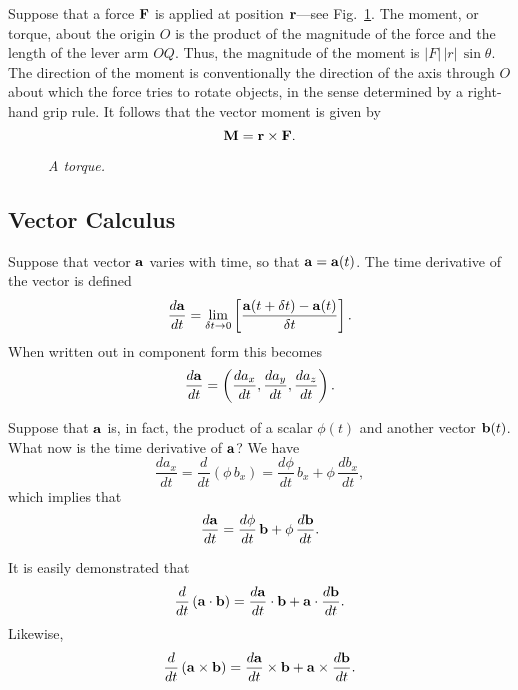 Suppose that a force ${\bf F}$ is applied at position ${\bf r}$---see Fig.~\ref{f8}.
The moment, or torque, about the origin $O$ is the product of the magnitude of the force and
the length of the lever arm $OQ$. Thus, the magnitude of the moment is
$|F|\,|r|\,\sin\theta$. The direction of the moment is conventionally the direction of
the axis through $O$ about which the force tries to rotate objects, in the sense
determined by a right-hand grip rule. It follows that the vector moment is
given by
\begin{equation}
{\bf M} = {\bf r}\times{\bf F}.
\end{equation}
\begin{figure}
\epsfysize=2.5in
\centerline{}
\caption{\em A torque.}\label{f8}
\end{figure}

\subsection{Vector Calculus} 
Suppose that  vector ${\bf a}$ varies with time, so that ${\bf a} = {\bf a} (t)$. The time
derivative of the vector is defined
\begin{equation}
\frac{d {\bf a}}{dt} = \lim_{\delta t\rightarrow 0} \left[\frac{{\bf a}(t+\delta t) - {\bf a}(t)}
{\delta t}\right].
\end{equation}
When written out in component form this becomes
\begin{equation}
\frac{d {\bf a}}{dt} = \left(\frac{d a_x}{dt}, \frac{d a_y}{d t}, \frac{d a_z}{ d t}\right).
\end{equation} 

Suppose that ${\bf a}$ is, in fact, the product of a scalar $\phi(t)$ and another vector
${\bf b}(t)$. What now is the time derivative of ${\bf a}$? We have
\begin{equation}
\frac{d a_x}{dt} = \frac{d}{dt}\!\left(\phi\, b_x\right) = \frac{d\phi}{dt}\, b_x + \phi \,
\frac{d b_x}{dt},
\end{equation}
which implies that
\begin{equation}
\frac{d {\bf a}}{dt} = \frac{d\phi}{dt}\, {\bf b} + \phi\, \frac{d {\bf b}}{dt}.
\end{equation}

It is easily demonstrated that 
\begin{equation}
\frac{d}{dt}\left({\bf a}\cdot{\bf b}\right) = \frac{d{\bf a}}{dt}\cdot {\bf b} +{\bf a}\cdot\frac{d{\bf b}}{dt}.
\end{equation}
Likewise,
\begin{equation}
\frac{d}{dt}\left({\bf a}\times{\bf b}\right) = \frac{d{\bf a}}{dt}\times{\bf b} + {\bf a}\times
\frac{d{\bf b}}{dt}.
\end{equation}

